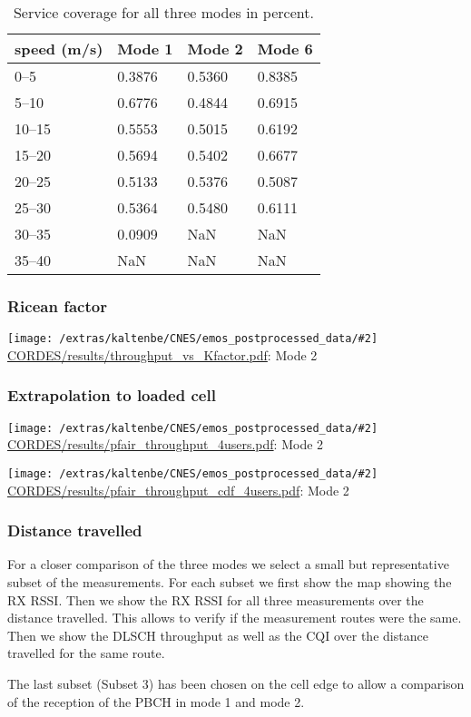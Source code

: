 \documentclass[a4paper,10pt]{article}
\newcommand{\printfile}[2][]{
 \begin{minipage}{8cm}
  \centering
  \texttt{[image: /extras/kaltenbe/CNES/emos\_postprocessed\_data/\#2]}
  \url{#2}: #1

 \end{minipage}
}
\begin{document}
\begin{table}
\centering
\begin{tabular}{l|l|l|l}
speed (m/s) & Mode 1 & Mode 2 & Mode 6\\
\hline
0--5   &   0.3876  &  0.5360 &   0.8385\\
5--10  &   0.6776  &  0.4844 &   0.6915\\
10--15 &   0.5553  &  0.5015 &   0.6192\\
15--20 &   0.5694  &  0.5402 &   0.6677\\
20--25 &   0.5133  &  0.5376 &   0.5087\\
25--30 &   0.5364  &  0.5480 &   0.6111\\
30--35 &   0.0909  &     NaN &      NaN\\
35--40 &      NaN  &     NaN &      NaN\\
\end{tabular}
\caption{Service coverage for all three modes in percent.}
\end{table}

\subsubsection{Ricean factor}

\printfile[Mode 2]{CORDES/results/throughput_vs_Kfactor.pdf}

\subsubsection{Extrapolation to loaded cell}

\printfile[Mode 2]{CORDES/results/pfair_throughput_4users.pdf}
\printfile[Mode 2]{CORDES/results/pfair_throughput_cdf_4users.pdf}

\subsubsection{Distance travelled}
\label{sec:dist_travelled_cordes}

For a closer comparison of the three modes we select a small but representative subset of the measurements. For each subset we first show the map showing the RX RSSI. Then we show the RX RSSI for all three measurements over the distance travelled. This allows to verify if the measurement routes were the same. Then we show the DLSCH throughput as well as the CQI over the distance travelled for the same route. 

The last subset (Subset 3) has been chosen on the cell edge to allow a comparison of the reception of the PBCH in mode 1 and mode 2.
\end{document}
